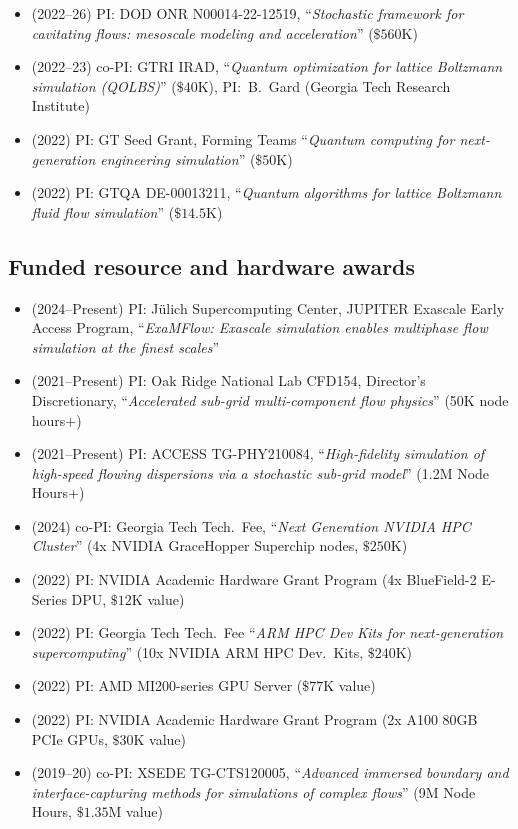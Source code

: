 \begin{itemize}
    \item (2022--26) PI: DOD ONR N00014-22-12519, ``\textit{Stochastic framework for cavitating flows: mesoscale modeling and acceleration}'' ($\$560$K)
    \item (2022--23) co-PI: GTRI IRAD, ``\textit{Quantum optimization for lattice Boltzmann simulation (QOLBS)}'' ($\$40$K), PI:~B.~Gard (Georgia Tech Research Institute)
    \item (2022) PI: GT Seed Grant, Forming Teams ``\textit{Quantum computing for next-generation engineering simulation}'' ($\$50$K)
    \item (2022) PI: GTQA DE-00013211, ``\textit{Quantum algorithms for lattice Boltzmann fluid flow simulation}'' ($\$14.5$K)
\end{itemize}

\subsection{Funded resource and hardware awards}

\begin{itemize}
    \item (2024--Present) PI: J\"ulich Supercomputing Center, JUPITER Exascale Early Access Program, ``\textit{ExaMFlow: Exascale simulation enables multiphase flow simulation at the finest scales}''
    \item (2021--Present) PI: Oak Ridge National Lab CFD154, Director's Discretionary, ``\textit{Accelerated sub-grid multi-component flow physics}'' (50K node hours+)
    \item (2021--Present) PI: ACCESS TG-PHY210084, ``\textit{High-fidelity simulation of high-speed flowing dispersions via a stochastic sub-grid model}'' (1.2M Node Hours+)
    \item (2024) co-PI: Georgia Tech Tech.\ Fee, ``\textit{Next Generation NVIDIA HPC Cluster}'' (4x NVIDIA GraceHopper Superchip nodes, $\$250$K)
    \item (2022) PI: NVIDIA Academic Hardware Grant Program (4x BlueField-2 E-Series DPU, $\$12$K value)
    \item (2022) PI: Georgia Tech Tech.\ Fee ``\textit{ARM HPC Dev Kits for next-generation supercomputing}'' (10x NVIDIA ARM HPC Dev.\ Kits, $\$240$K)
    \item (2022) PI: AMD MI200-series GPU Server ($\$77$K value)
    \item (2022) PI: NVIDIA Academic Hardware Grant Program (2x A100 80GB PCIe GPUs, $\$30$K value)
    \item (2019--20) co-PI: XSEDE TG-CTS120005, ``\textit{Advanced immersed boundary and interface-capturing methods for simulations of complex flows}'' (9M Node Hours, $\$1.35$M value)
\end{itemize}

